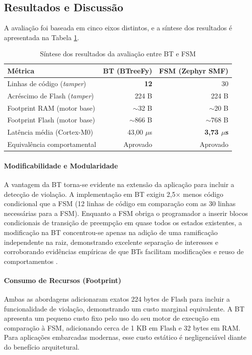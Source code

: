 \documentclass[conference]{IEEEtran}
\begin{document}
\subsection{Resultados e Discussão}
A avaliação foi baseada em cinco eixos distintos, e a síntese dos resultados é apresentada na Tabela \ref{tab:results_summary}.

\begin{table}[ht]
\centering
\caption{Síntese dos resultados da avaliação entre BT e FSM}
\label{tab:results_summary}
\begin{tabular}{lrr}
\hline
\textbf{Métrica} & \textbf{BT (BTreeFy)} & \textbf{FSM (Zephyr SMF)} \\
\hline
Linhas de código (\textit{tamper}) & \textbf{12} & 30 \\
Acréscimo de Flash (\textit{tamper}) & 224 B & 224 B \\
Footprint RAM (motor base) & $\sim$32 B & $\sim$20 B \\
Footprint Flash (motor base) & $\sim$866 B & $\sim$768 B \\
Latência média (Cortex-M0) & 43,00 $\mu$s & \textbf{3,73 $\mu$s} \\
Equivalência comportamental & Aprovado & Aprovado \\
\hline
\end{tabular}
\end{table}

\paragraph{\textbf{Modificabilidade e Modularidade}} 
A vantagem da BT torna-se evidente na extensão da aplicação para incluir a detecção de violação. A implementação em BT exigiu 2,5$\times$ menos código condicional que a FSM (12 linhas de código em comparação com as 30 linhas necessárias para a FSM). Enquanto a FSM obriga o programador a inserir blocos condicionais de transição de preempção em quase todos os estados existentes, a modificação na BT concentrou-se apenas na adição de uma ramificação independente na raiz, demonstrando excelente separação de interesses e corroborando evidências empíricas de que BTs facilitam modificações e reuso de comportamentos \cite{dragule_effects_2025}.

\paragraph{\textbf{Consumo de Recursos (Footprint)}} 
Ambas as abordagens adicionaram exatos 224 bytes de Flash para incluir a funcionalidade de violação, demonstrando um custo marginal equivalente. A BT apresenta um pequeno custo fixo pelo uso do seu motor de execução em comparação à FSM, adicionando cerca de 1 KB em Flash e 32 bytes em RAM. Para aplicações embarcadas modernas, esse custo estático é negligenciável diante do benefício arquitetural.
\end{document}
